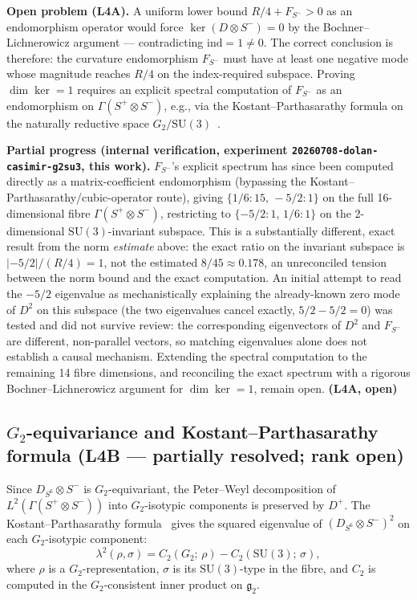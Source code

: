\documentclass[12pt,a4paper]{article}
\newcommand{\ind}{\mathrm{ind}}
\begin{document}
\textbf{Open problem (L4A).} A uniform lower bound $R/4 + F_{S^-} > 0$ as an
endomorphism operator would force $\ker(D\otimes S^-)=0$ by the Bochner--Lichnerowicz
argument --- contradicting $\ind=1\neq 0$. The correct conclusion is therefore: the
curvature endomorphism $F_{S^-}$ must have at least one negative mode whose magnitude
reaches $R/4$ on the index-required subspace. Proving $\dim\ker=1$ requires an explicit
spectral computation of $F_{S^-}$ as an endomorphism on $\Gamma(S^+\otimes S^-)$,
e.g., via the Kostant--Parthasarathy formula on the naturally reductive space
$G_2/\mathrm{SU}(3)$~\cite{Agricola2002}.

\textbf{Partial progress (internal verification, experiment
\texttt{20260708-dolan-casimir-g2su3}, this work).} $F_{S^-}$'s explicit spectrum has
since been computed directly as a matrix-coefficient endomorphism (bypassing the
Kostant--Parthasarathy/cubic-operator route), giving $\{1/6:15,\,-5/2:1\}$ on the full
16-dimensional fibre $\Gamma(S^+\otimes S^-)$, restricting to $\{-5/2:1,\,1/6:1\}$ on the
2-dimensional $\mathrm{SU}(3)$-invariant subspace. This is a substantially different,
exact result from the norm \emph{estimate} above: the exact ratio on the invariant
subspace is $|{-}5/2|/(R/4)=1$, not the estimated $8/45\approx 0.178$, an unreconciled
tension between the norm bound and the exact computation. An initial attempt to read the
$-5/2$ eigenvalue as mechanistically explaining the already-known zero mode of $D^2$ on
this subspace (the two eigenvalues cancel exactly, $5/2-5/2=0$) was tested and did not
survive review: the corresponding eigenvectors of $D^2$ and $F_{S^-}$ are different,
non-parallel vectors, so matching eigenvalues alone does not establish a causal
mechanism. Extending the spectral computation to the remaining 14 fibre dimensions, and
reconciling the exact spectrum with a rigorous Bochner--Lichnerowicz argument for
$\dim\ker=1$, remain open. \textbf{(L4A, open)}

\subsection{\texorpdfstring{$G_2$}{G2}-equivariance and Kostant--Parthasarathy formula (L4B --- partially resolved; rank open)}
\label{sec:schur}

Since $D_{S^6}\otimes S^-$ is $G_2$-equivariant, the Peter--Weyl decomposition of
$L^2(\Gamma(S^+\otimes S^-))$ into $G_2$-isotypic components is preserved by $D^+$.
The Kostant--Parthasarathy formula~\cite{Agricola2002} gives the squared eigenvalue
of $(D_{S^6}\otimes S^-)^2$ on each $G_2$-isotypic component:
\begin{equation}
  \lambda^2(\rho,\sigma) = C_2(G_2;\,\rho) - C_2(\mathrm{SU}(3);\,\sigma),
\end{equation}
where $\rho$ is a $G_2$-representation, $\sigma$ is its $\mathrm{SU}(3)$-type in the fibre,
and $C_2$ is computed in the $G_2$-consistent inner product on $\mathfrak{g}_2$.
\end{document}
